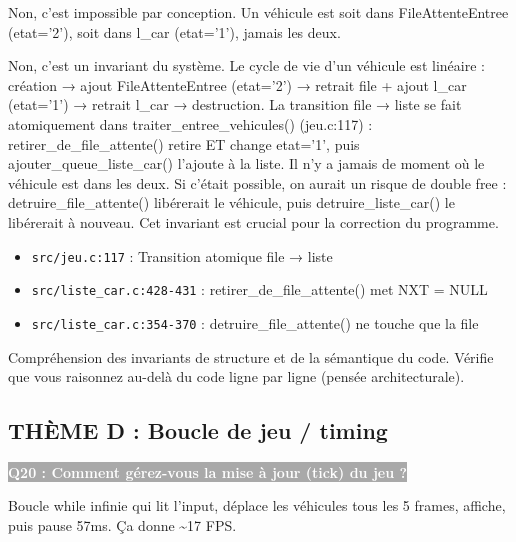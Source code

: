 \documentclass[12pt,a4paper]{article}
\newcommand{\question}[1]{%
    \vspace{0.5cm}
    \noindent\colorbox{darkgray}{\textcolor{white}{\textbf{#1}}}
    \vspace{0.3cm}
}
\begin{document}
\begin{reponse_courte}
Non, c'est impossible par conception. Un véhicule est soit dans FileAttenteEntree (etat='2'), soit dans l\_car (etat='1'), jamais les deux.
\end{reponse_courte}

\begin{reponse_longue}
Non, c'est un invariant du système. Le cycle de vie d'un véhicule est linéaire : création → ajout FileAttenteEntree (etat='2') → retrait file + ajout l\_car (etat='1') → retrait l\_car → destruction. La transition file → liste se fait atomiquement dans traiter\_entree\_vehicules() (jeu.c:117) : retirer\_de\_file\_attente() retire ET change etat='1', puis ajouter\_queue\_liste\_car() l'ajoute à la liste. Il n'y a jamais de moment où le véhicule est dans les deux. Si c'était possible, on aurait un risque de double free : detruire\_file\_attente() libérerait le véhicule, puis detruire\_liste\_car() le libérerait à nouveau. Cet invariant est crucial pour la correction du programme.
\end{reponse_longue}

\begin{reference_code}
\begin{itemize}
    \item \texttt{src/jeu.c:117} : Transition atomique file → liste
    \item \texttt{src/liste\_car.c:428-431} : retirer\_de\_file\_attente() met NXT = NULL
    \item \texttt{src/liste\_car.c:354-370} : detruire\_file\_attente() ne touche que la file
\end{itemize}
\end{reference_code}

\begin{objectif_prof}
Compréhension des invariants de structure et de la sémantique du code. Vérifie que vous raisonnez au-delà du code ligne par ligne (pensée architecturale).
\end{objectif_prof}

\subsection{THÈME D : Boucle de jeu / timing}

\question{Q20 : Comment gérez-vous la mise à jour (tick) du jeu ?}

\begin{reponse_courte}
Boucle while infinie qui lit l'input, déplace les véhicules tous les 5 frames, affiche, puis pause 57ms. Ça donne \textasciitilde{}17 FPS.
\end{reponse_courte}
\end{document}
